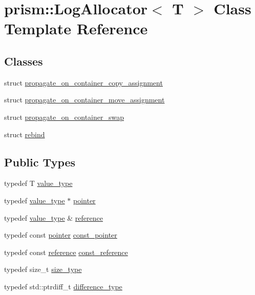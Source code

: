 \hypertarget{classprism_1_1_log_allocator}{}\section{prism\+:\+:Log\+Allocator$<$ T $>$ Class Template Reference}
\label{classprism_1_1_log_allocator}
\subsection*{Classes}
\begin{DoxyCompactItemize}
\item 
struct \hyperlink{structprism_1_1_log_allocator_1_1propagate__on__container__copy__assignment}{propagate\+\_\+on\+\_\+container\+\_\+copy\+\_\+assignment}
\item 
struct \hyperlink{structprism_1_1_log_allocator_1_1propagate__on__container__move__assignment}{propagate\+\_\+on\+\_\+container\+\_\+move\+\_\+assignment}
\item 
struct \hyperlink{structprism_1_1_log_allocator_1_1propagate__on__container__swap}{propagate\+\_\+on\+\_\+container\+\_\+swap}
\item 
struct \hyperlink{structprism_1_1_log_allocator_1_1rebind}{rebind}
\end{DoxyCompactItemize}
\subsection*{Public Types}
\begin{DoxyCompactItemize}
\item 
typedef T \hyperlink{classprism_1_1_log_allocator_a84ee349868301d14e91f9876bbf2de27}{value\+\_\+type}
\item 
typedef \hyperlink{classprism_1_1_log_allocator_a84ee349868301d14e91f9876bbf2de27}{value\+\_\+type} $\ast$ \hyperlink{classprism_1_1_log_allocator_aa95e52dd075368ba542af3da925e6c16}{pointer}
\item 
typedef \hyperlink{classprism_1_1_log_allocator_a84ee349868301d14e91f9876bbf2de27}{value\+\_\+type} \& \hyperlink{classprism_1_1_log_allocator_a736d959fa8370b20de2bac647b3ddf8c}{reference}
\item 
typedef const \hyperlink{classprism_1_1_log_allocator_aa95e52dd075368ba542af3da925e6c16}{pointer} \hyperlink{classprism_1_1_log_allocator_a3533183bc11b2c633d54d7504b515c77}{const\+\_\+pointer}
\item 
typedef const \hyperlink{classprism_1_1_log_allocator_a736d959fa8370b20de2bac647b3ddf8c}{reference} \hyperlink{classprism_1_1_log_allocator_a8dd85b419a302b7d9cf946726a240a4d}{const\+\_\+reference}
\item 
typedef size\+\_\+t \hyperlink{classprism_1_1_log_allocator_a23a86945109072959b47b6becda9925f}{size\+\_\+type}
\item 
typedef std\+::ptrdiff\+\_\+t \hyperlink{classprism_1_1_log_allocator_a5cc7253b1e10c86645bd8dbd3ea70858}{difference\+\_\+type}
\end{DoxyCompactItemize}
